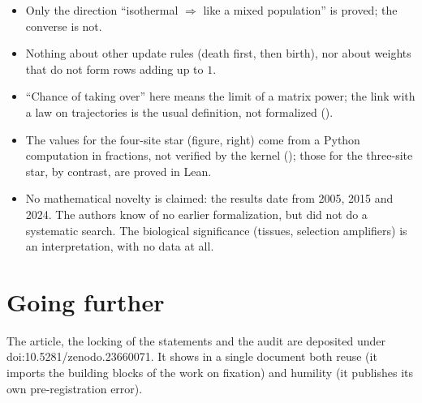 \begin{limite}
\begin{itemize}
\item Only the direction ``isothermal $\Rightarrow$ like a mixed population'' is proved; the converse is not.
\item Nothing about other update rules (death first, then birth), nor about weights that do not form rows adding up
  to $1$.
\item ``Chance of taking over'' here means the limit of a matrix power; the link with a law on trajectories is the
  usual definition, not formalized ().
\item The values for the four-site star (figure, right) come from a Python computation in fractions, not
  verified by the kernel (); those for the three-site star, by contrast, are proved in Lean.
\item No mathematical novelty is claimed: the results date from 2005, 2015 and 2024. The authors know of no earlier
  formalization, but did not do a systematic search. The biological significance (tissues, selection amplifiers)
  is an interpretation, with no data at all.
\end{itemize}
\end{limite}

\section*{Going further}

The article, the locking of the statements and the audit are deposited under doi:10.5281/\allowbreak zenodo.23660071.
It shows in a single document both reuse (it imports the building blocks of the work on fixation) and humility (it
publishes its own pre-registration error).
